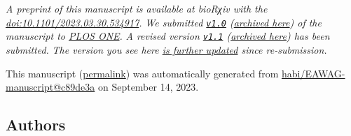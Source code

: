 \emph{A preprint of this manuscript is available at bioRχiv with the \href{https://doi.org/10.1101/2023.03.30.534917}{doi:10.1101/2023.03.30.534917}.}
\emph{We submitted \href{https://github.com/habi/EAWAG-manuscript/releases/tag/v1.0}{\texttt{v1.0}} (\href{https://habi.github.io/EAWAG-manuscript/v/e1e2ef76a476174a4115937d77457037ddec95df/}{archived here}) of the manuscript to \href{https://journals.plos.org/plosone/}{PLOS ONE}.}
\emph{A revised version \href{https://github.com/habi/EAWAG-manuscript/releases/tag/v1.1}{\texttt{v1.1}} (\href{https://habi.github.io/EAWAG-manuscript/v/c49d0b8ac8f078c226318972b06e8c4a39100bb2/}{archived here}) has been submitted.}
\emph{The version you see here \href{https://github.com/habi/EAWAG-manuscript/compare/df99415...c89de3aab786e55c724102ed14dbb33fb23561e5\#files_bucket}{is further updated} since re-submission.}

This manuscript
(\href{https://habi.github.io/EAWAG-manuscript/v/c89de3aab786e55c724102ed14dbb33fb23561e5/}{permalink})
was automatically generated
from \href{https://github.com/habi/EAWAG-manuscript/tree/c89de3aab786e55c724102ed14dbb33fb23561e5}{habi/EAWAG-manuscript@c89de3a}
on September 14, 2023.

\hypertarget{authors}{%
\subsection{Authors}\label{authors}}

